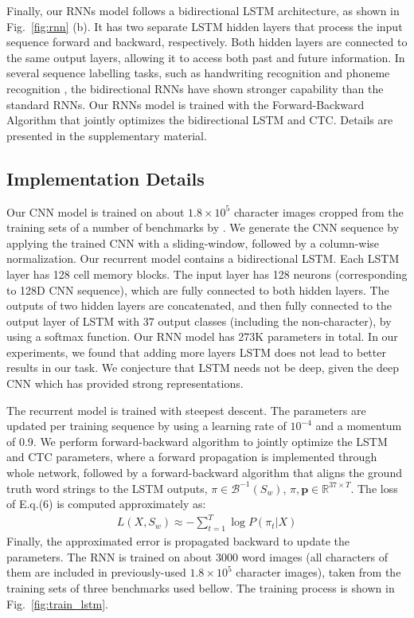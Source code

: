 \documentclass[letterpaper]{article}
\begin{document}
Finally, our RNNs model follows a bidirectional LSTM architecture, as shown in Fig.~\ref{fig:rnn} (b). It has two separate LSTM hidden layers that process the input sequence forward and backward, respectively. Both hidden layers are connected to the same output layers, allowing it to access both past and future information. In several sequence labelling tasks, such as handwriting recognition \cite{Graves2009} and phoneme recognition \cite{Graves2005}, the bidirectional RNNs have shown stronger capability than the standard RNNs. Our RNNs model is trained with the Forward-Backward Algorithm that jointly optimizes the bidirectional LSTM and CTC. Details are presented in the supplementary material.

\subsection{Implementation Details}
%
Our CNN model is trained on about $1.8 \times 10^5$ character images cropped from the training sets of a number of benchmarks by \cite{Jaderberg2014}. We generate the CNN sequence by applying the trained CNN with a sliding-window, followed by a column-wise normalization.
%
Our recurrent model contains a bidirectional LSTM. Each LSTM layer has 128  cell memory blocks. The input layer has 128 neurons (corresponding to 128D CNN sequence),  which are fully connected to both hidden layers. The outputs of two hidden layers are concatenated, and then fully connected to the output layer of LSTM with 37 output classes (including the non-character), by using a softmax function.
%
Our RNN model has 273K parameters in total. In our experiments, we found that adding more layers LSTM does not lead to better results in our task. We conjecture that LSTM needs not be deep, given the deep CNN which has provided strong representations.

The recurrent model is trained with steepest descent. The parameters are updated per training sequence by using a learning rate of $10^{-4}$ and a momentum of 0.9.
We perform forward-backward algorithm \cite{Graves2006} to jointly optimize the LSTM and CTC parameters, where a forward propagation is implemented through whole network, followed by a forward-backward algorithm that aligns the ground truth word strings to the LSTM outputs, $\pi \in \mathcal{B}^{-1}(S_w)$, $\pi,\textbf{p}\in\mathbb{R}^{37\times T}$. The loss of E.q.(6) is computed approximately as:
\begin{eqnarray}
L(X,S_w)\approx -\sum_{t=1}^T\log P(\pi_t|X)
\end{eqnarray}
Finally, the approximated error is  propagated backward to update the parameters. The RNN is trained on about $3000$ word images (all characters of them are included in previously-used $1.8 \times 10^5$ character images), taken from the training sets of three benchmarks used bellow. The training process is shown in Fig.~\ref{fig:train_lstm}.
\end{document}
